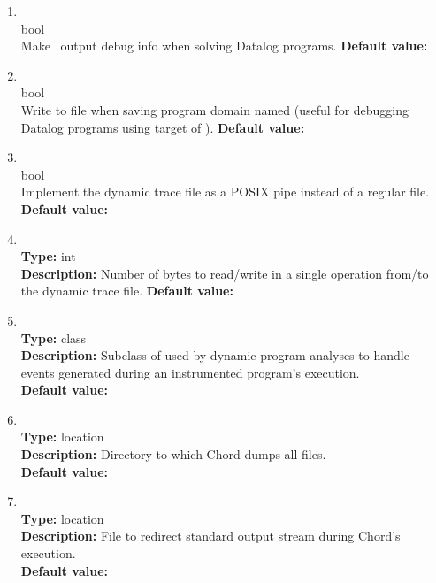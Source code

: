 \begin{enumerate}
\item
{} \\
 bool \\
 Make \bddbddb\ output debug info when solving Datalog programs.
{\bf Default value:}  \\

\item
{} \\
 bool \\
 Write to file 
when saving program domain named  (useful for debugging Datalog programs using
 target of ).
{\bf Default value:}  \\

\item
{} \\
 bool \\
 Implement the dynamic trace file as a POSIX pipe instead of a regular file.
{\bf Default value:}  \\

\item
{} \\
{\bf Type:} int \\
{\bf Description:} Number of bytes to read/write in a single operation from/to the dynamic trace file.
{\bf Default value:}  \\

\item
{} \\
{\bf Type:} class \\
{\bf Description:} Subclass of  used by dynamic program analyses to handle events generated during an instrumented program's execution. \\
{\bf Default value:}  

\item
{} \\
{\bf Type:} location \\
{\bf Description:} Directory to which Chord dumps all files. \\
{\bf Default value:}  

\item
{} \\
{\bf Type:} location \\
{\bf Description:} File to redirect standard output stream during Chord's execution. \\
{\bf Default value:} 


\end{enumerate}
